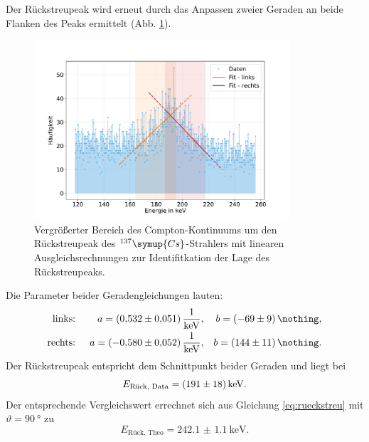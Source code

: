 Der Rückstreupeak wird erneut durch das Anpassen zweier Geraden an beide Flanken des Peaks ermittelt (Abb. \ref{fig:cs_rueck}).
\begin{figure}[h!]
  \centering
  \includegraphics[width=0.85\textwidth]{content/images/caesium_rueckstreupeak.pdf}
  \caption{Vergrößerter Bereich des Compton-Kontinuums um den Rückstreupeak des $^{137}\symup{Cs}$-Strahlers mit linearen Ausgleichsrechnungen zur Identifitkation der Lage des Rückstreupeaks.}
  \label{fig:cs_rueck}
\end{figure}
Die Parameter beider Geradengleichungen lauten:
\begin{align*}
	\text{links: }  && a = \SI{0.532 (51) }{\frac{1}{\kilo \electronvolt}},  && b = \SI{-69 (9) }{\nothing}, \\
	\text{rechts: } && a = \SI{-0.580 (52) }{\frac{1}{\kilo \electronvolt}}, && b = \SI{144 (11) }{\nothing}. \\
\end{align*}
Der Rückstreupeak entspricht dem Schnittpunkt beider Geraden und liegt bei
\begin{equation*}
	E_{\text{Rück, Data}} = \SI{191 (18)}{\kilo \electronvolt}.
\end{equation*}
Der entsprechende Vergleichswert errechnet sich aus Gleichung \eqref{eq:rueckstreu} mit $\vartheta = \SI{90}{°}$ zu
\begin{equation*}
	E_{\text{Rück, Theo}} = \SI{242.1(11)}{\kilo \electronvolt}.
\end{equation*}
\FloatBarrier


